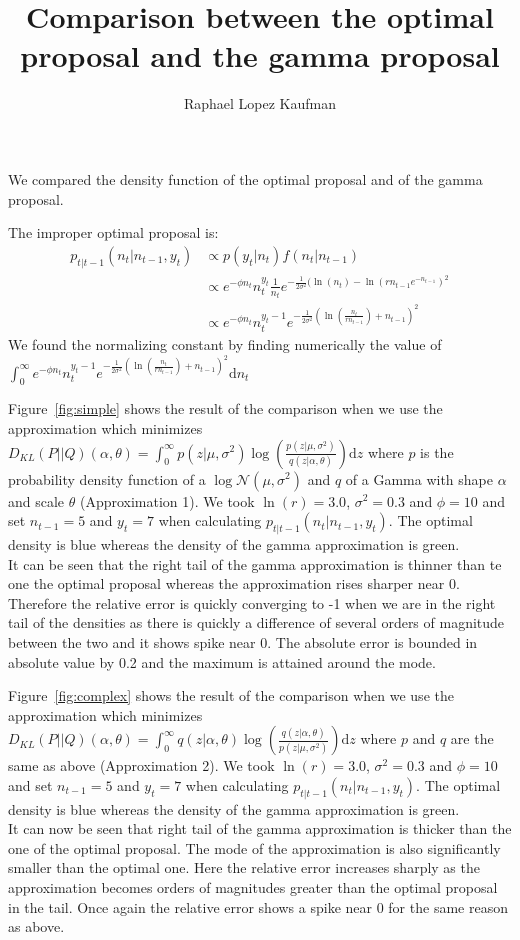 \documentclass{article}
\title{Comparison between the optimal proposal and the gamma proposal}
\author{Raphael Lopez Kaufman}
\date{}
\begin{document}
We compared the density function of the optimal proposal and of the gamma proposal.

The improper optimal proposal is:
\begin{equation*}
\begin{split}
p_{t|t-1}(n_t|n_{t-1}, y_t) & \propto  p(y_t|n_t)f(n_t|n_{t-1}) \\
& \propto e^{-\phi n_t}n_t^{y_t}\frac{1}{n_t} e^{-\frac{1}{2\sigma^2}(\ln(n_t)-\ln(rn_{t-1}e^{-n_{t-1}})^2} \\
& \propto e^{-\phi n_t}n_t^{y_t-1}e^{-\frac{1}{2\sigma^2}(\ln(\frac{n_t}{rn_{t-1}})+n_{t-1})^2}
\end{split}
\end{equation*}
We found the normalizing constant by finding numerically the value of $\int_{0}^{\infty}e^{-\phi n_t}n_t^{y_t-1}e^{-\frac{1}{2\sigma^2}(\ln(\frac{n_t}{rn_{t-1}})+n_{t-1})^2} \mathrm{d}n_t$

Figure~\ref{fig:simple} shows the result of the comparison when we use the approximation which minimizes $D_{KL}(P||Q)(\alpha, \theta) = \int_{0}^{\infty}{p(z|\mu, \sigma^2)\log(\frac{p(z|\mu, \sigma^2)}{q(z|\alpha, \theta)})\mathrm{d}z}$
where $p$ is the probability density function of a $\log\mathcal{N}(\mu, \sigma^2)$ and $q$ of a Gamma with shape $\alpha$ and scale $\theta$ (Approximation 1). We took $\ln(r) = 3.0$, $\sigma^2 = 0.3$ and $\phi = 10$ and set $n_{t-1} = 5$ and $y_t = 7$ when calculating $p_{t|t-1}(n_t|n_{t-1}, y_t)$. The optimal density is blue whereas the density of the gamma approximation is green. \\
It can be seen that the right tail of the gamma approximation is thinner than te one the optimal proposal whereas the approximation rises sharper near 0. Therefore the relative error is quickly converging to -1 when we are in the right tail of the densities as there is quickly a difference of several orders of magnitude between the two and it shows spike near 0. The absolute error is bounded in absolute value by 0.2 and the maximum is attained around the mode. 

Figure~\ref{fig:complex} shows the result of the comparison when we use the approximation which minimizes $	D_{KL}(P||Q)(\alpha, \theta) = \int_{0}^{\infty}{q(z|\alpha, \theta)\log(\frac{q(z|\alpha, \theta)}{p(z|\mu, \sigma^2)})\mathrm{d}z}$
where $p$ and $q$ are the same as above (Approximation 2). We took $\ln(r) = 3.0$, $\sigma^2 = 0.3$ and $\phi = 10$ and set $n_{t-1} = 5$ and $y_t = 7$ when calculating $p_{t|t-1}(n_t|n_{t-1}, y_t)$. The optimal density is blue whereas the density of the gamma approximation is green. \\
It can now be seen that right tail of the gamma approximation is thicker than the one of the optimal proposal. The mode of the approximation is also significantly smaller than the optimal one. Here the relative error increases sharply as the approximation becomes orders of magnitudes greater than the optimal proposal in the tail. Once again the relative error shows a spike near 0 for the same reason as above.
\end{document}
